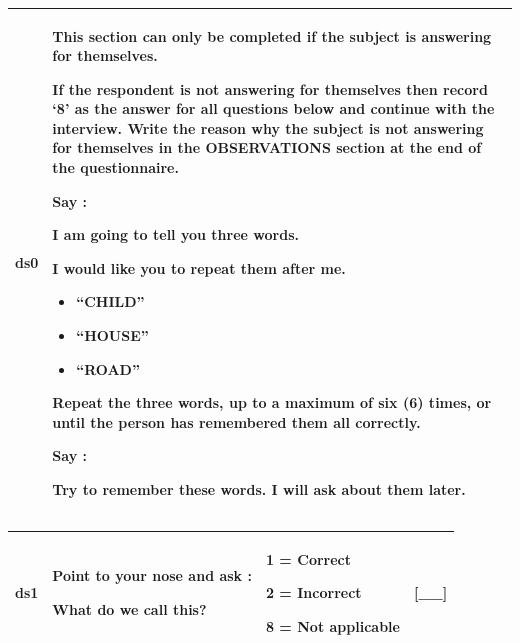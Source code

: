 \documentclass[12pt,a4paper]{book}
\theoremstyle{definition}
\theoremstyle{definition}
\theoremstyle{definition}
\theoremstyle{remark}
\begin{document}
\begin{longtable}[]{@{}ll@{}}
\toprule
\begin{minipage}[t]{0.48\columnwidth}\raggedright
ds0\strut
\end{minipage} & \begin{minipage}[t]{0.48\columnwidth}\raggedright
This section can only be completed if the subject is answering for
themselves.

If the respondent is not answering for themselves then record `8' as the
answer for all questions below and continue with the interview. Write
the reason why the subject is not answering for themselves in the
OBSERVATIONS section at the end of the questionnaire.

Say :

I am going to tell you three words.

I would like you to repeat them after me.

\begin{itemize}
\item
  ``CHILD''
\item
  ``HOUSE''
\item
  ``ROAD''
\end{itemize}

Repeat the three words, up to a maximum of six (6) times, or until the
person has remembered them all correctly.

Say :

Try to remember these words. I will ask about them later.\strut
\end{minipage}\tabularnewline
\bottomrule
\end{longtable}

\begin{longtable}[]{@{}llll@{}}
\toprule
\begin{minipage}[t]{0.24\columnwidth}\raggedright
ds1\strut
\end{minipage} & \begin{minipage}[t]{0.24\columnwidth}\raggedright
Point to your nose and ask :

What do we call this?\strut
\end{minipage} & \begin{minipage}[t]{0.24\columnwidth}\raggedright
1 = Correct

2 = Incorrect

8 = Not applicable\strut
\end{minipage} & \begin{minipage}[t]{0.24\columnwidth}\raggedright
{[}\_\_{]}\strut
\end{minipage}\tabularnewline
\bottomrule
\end{longtable}
\end{document}
